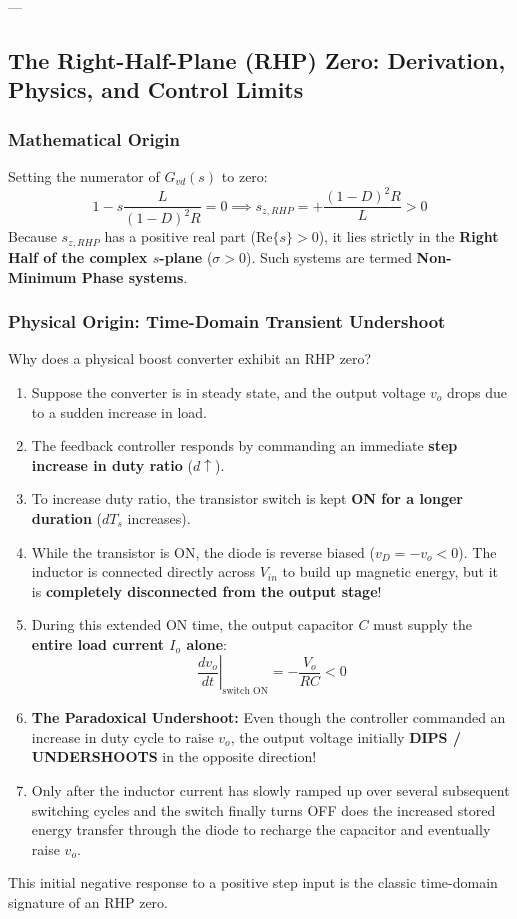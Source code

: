 ---

\subsection{The Right-Half-Plane (RHP) Zero: Derivation, Physics, and Control Limits}

\subsubsection{Mathematical Origin}
Setting the numerator of $G_{vd}(s)$ to zero:
\begin{equation}
1 - s \frac{L}{(1-D)^2 R} = 0 \implies s_{z,RHP} = +\frac{(1-D)^2 R}{L} > 0
\end{equation}
Because $s_{z,RHP}$ has a positive real part ($\mathrm{Re}\{s\} > 0$), it lies strictly in the \textbf{Right Half of the complex $s$-plane} ($\sigma > 0$). Such systems are termed \textbf{Non-Minimum Phase systems}.

\subsubsection{Physical Origin: Time-Domain Transient Undershoot}
Why does a physical boost converter exhibit an RHP zero?
\begin{enumerate}
  \item Suppose the converter is in steady state, and the output voltage $v_o$ drops due to a sudden increase in load.
  \item The feedback controller responds by commanding an immediate \textbf{step increase in duty ratio} ($d \uparrow$).
  \item To increase duty ratio, the transistor switch is kept \textbf{ON for a longer duration} ($d T_s$ increases).
  \item While the transistor is ON, the diode is reverse biased ($v_D = -v_o < 0$). The inductor is connected directly across $V_{in}$ to build up magnetic energy, but it is \textbf{completely disconnected from the output stage}!
  \item During this extended ON time, the output capacitor $C$ must supply the \textbf{entire load current $I_o$ alone}:
  \begin{equation}
  \left.\frac{dv_o}{dt}\right|_{\text{switch ON}} = -\frac{V_o}{R C} < 0
  \end{equation}
  \item \textbf{The Paradoxical Undershoot:} Even though the controller commanded an increase in duty cycle to raise $v_o$, the output voltage initially \textbf{DIPS / UNDERSHOOTS} in the opposite direction!
  \item Only after the inductor current has slowly ramped up over several subsequent switching cycles and the switch finally turns OFF does the increased stored energy transfer through the diode to recharge the capacitor and eventually raise $v_o$.
\end{enumerate}
This initial negative response to a positive step input is the classic time-domain signature of an RHP zero.

